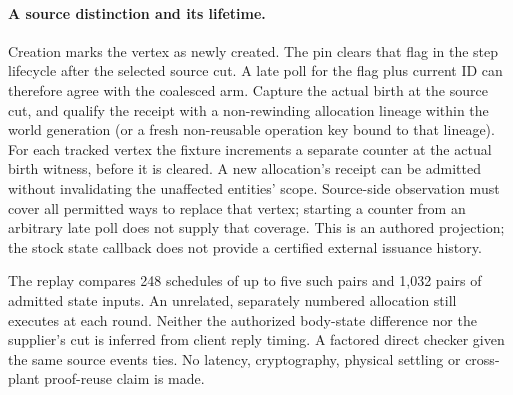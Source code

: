\documentclass{article}
\begin{document}
\paragraph{A source distinction and its lifetime.}
Creation marks the vertex as newly created. The pin clears that flag
in the step lifecycle after the selected source cut. A late poll for
the flag plus current ID can therefore agree with the coalesced arm.
Capture the actual birth at the source cut, and qualify the receipt
with a non-rewinding allocation lineage within the world generation
(or a fresh non-reusable operation key bound to that lineage).
For each tracked vertex the fixture increments a separate counter at
the actual birth witness, before it is cleared. A new allocation's
receipt can be admitted without invalidating the unaffected entities'
scope. Source-side observation must cover all permitted ways to
replace that vertex; starting a counter from an arbitrary late poll
does not supply that coverage. This is an authored projection; the
stock state callback does not provide a certified external issuance
history.

The replay compares 248 schedules of up to five such pairs and 1,032
pairs of admitted state inputs. An unrelated, separately numbered
allocation still executes at each round. Neither the authorized
body-state difference nor the supplier's cut is inferred from client
reply timing. A factored direct checker given the same source events
ties. No latency, cryptography, physical settling or cross-plant
proof-reuse claim is made.
\end{document}
